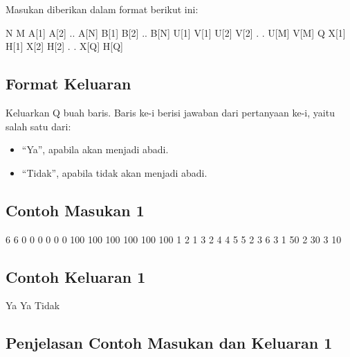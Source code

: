 \documentclass[../main_problemset.tex]{subfiles} %
\begin{document}
Masukan diberikan dalam format berikut ini:

\begin{lcverbatim}
N M
A[1] A[2] .. A[N]
B[1] B[2] .. B[N]
U[1] V[1]
U[2] V[2]
.
.
U[M] V[M]
Q
X[1] H[1]
X[2] H[2]
.
.
X[Q] H[Q]
\end{lcverbatim}

\subsection*{Format Keluaran}

Keluarkan Q buah baris. Baris ke-i berisi jawaban dari pertanyaan ke-i, yaitu salah satu dari:

\begin{itemize}
	\item ``Ya'', apabila akan menjadi abadi.
	\item ``Tidak'', apabila tidak akan menjadi abadi.
\end{itemize}

\vspace{.4cm}

\begin{minipage}[t]{0.5\textwidth}
\subsection*{Contoh Masukan 1}

\begin{lcverbatim}
6 6
0 0 0 0 0 0
100 100 100 100 100 100
1 2
1 3
2 4
4 5
5 2
3 6
3
1 50
2 30
3 10
\end{lcverbatim}
\end{minipage}
\begin{minipage}[t]{0.5\textwidth}
\subsection*{Contoh Keluaran 1}

\begin{lcverbatim}
Ya
Ya
Tidak
\end{lcverbatim}
\end{minipage}

\subsection*{Penjelasan Contoh Masukan dan Keluaran 1}
\end{document}
